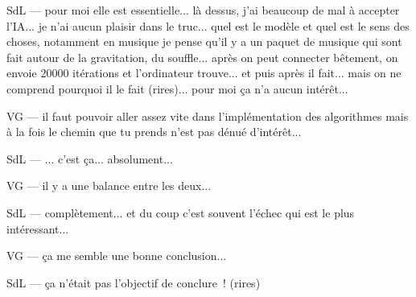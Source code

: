 SdL — pour moi elle est essentielle... là dessus, j'ai beaucoup de mal à accepter l'IA... je n'ai aucun plaisir dans le truc... quel est le modèle et quel est le sens des choses, notamment en musique je pense qu'il y a un paquet de musique qui sont fait autour de la gravitation, du souffle... après on peut connecter bêtement, on envoie 20000 itérations et l'ordinateur trouve... et puis après il fait... mais on ne comprend pourquoi il le fait (rires)... pour moi ça n'a aucun intérêt... 

VG — il faut pouvoir aller assez vite dans l'implémentation des algorithmes mais à la fois le chemin que tu prends n'est pas dénué d'intérêt... 

SdL — ... c'est ça... absolument... 

VG — il y a une balance entre les deux... 

SdL — complètement... et du coup c'est souvent l'échec qui est le plus intéressant... 

VG — ça me semble une bonne conclusion... 

SdL — ça n'était pas l'objectif de conclure ! (rires) 

